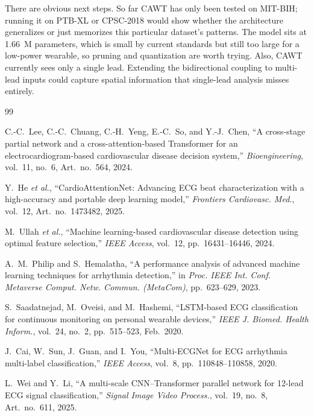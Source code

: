 \documentclass[conference]{IEEEtran}
\begin{document}
There are obvious next steps. So far CAWT has only been tested on MIT-BIH; running it on PTB-XL or CPSC-2018 would show whether the architecture generalizes or just memorizes this particular dataset's patterns. The model sits at 1.66~M parameters, which is small by current standards but still too large for a low-power wearable, so pruning and quantization are worth trying. Also, CAWT currently sees only a single lead. Extending the bidirectional coupling to multi-lead inputs could capture spatial information that single-lead analysis misses entirely.
 
\begin{thebibliography}{99}
 
C.-C.~Lee, C.-C.~Chuang, C.-H.~Yeng, E.-C.~So, and Y.-J.~Chen, ``A cross-stage partial network and a cross-attention-based Transformer for an electrocardiogram-based cardiovascular disease decision system,'' \emph{Bioengineering}, vol.~11, no.~6, Art.~no.~564, 2024.
 
Y.~He \emph{et al.}, ``CardioAttentionNet: Advancing ECG beat characterization with a high-accuracy and portable deep learning model,'' \emph{Frontiers Cardiovasc. Med.}, vol.~12, Art.~no.~1473482, 2025.
 
M.~Ullah \emph{et al.}, ``Machine learning-based cardiovascular disease detection using optimal feature selection,'' \emph{IEEE Access}, vol.~12, pp.~16431--16446, 2024.
 
A.~M.~Philip and S.~Hemalatha, ``A performance analysis of advanced machine learning techniques for arrhythmia detection,'' in \emph{Proc. IEEE Int. Conf. Metaverse Comput. Netw. Commun. (MetaCom)}, pp.~623--629, 2023.
 
S.~Saadatnejad, M.~Oveisi, and M.~Hashemi, ``LSTM-based ECG classification for continuous monitoring on personal wearable devices,'' \emph{IEEE J. Biomed. Health Inform.}, vol.~24, no.~2, pp.~515--523, Feb.~2020.
 
J.~Cai, W.~Sun, J.~Guan, and I.~You, ``Multi-ECGNet for ECG arrhythmia multi-label classification,'' \emph{IEEE Access}, vol.~8, pp.~110848--110858, 2020.
 
L.~Wei and Y.~Li, ``A multi-scale CNN--Transformer parallel network for 12-lead ECG signal classification,'' \emph{Signal Image Video Process.}, vol.~19, no.~8, Art.~no.~611, 2025.
 

\end{thebibliography}
\end{document}
